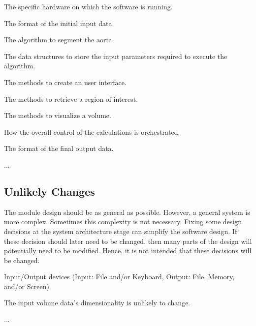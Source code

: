 \documentclass[12pt, titlepage]{article}
\newcounter{acnum}
\newcommand{\actheacnum}{AC\theacnum}
\newcounter{ucnum}
\newcommand{\uctheucnum}{UC\theucnum}
\begin{document}
\begin{description}
\item[ \actheacnum \label{acHardware}:] The specific hardware on which the software is running.
\item[ \actheacnum \label{acInput}:] The format of the initial input data.
\item[ \actheacnum \label{acAlgo}:] The algorithm to segment the aorta.
\item[ \actheacnum \label{acInputParams}:] The data structures to store the input parameters required to execute the algorithm.
\item[ \actheacnum \label{acInterface}:] The methods to create an user interface.
\item[ \actheacnum \label{acGetROI}:] The methods to retrieve a region of interest.
\item[ \actheacnum \label{acVisualize}:] The methods to visualize a volume.
\item[ \actheacnum \label{acControl}:] How the overall control of the calculations is orchestrated.
\item[ \actheacnum \label{acOutput}:] The format of the final output data.

\item ...
\end{description}

\subsection{Unlikely Changes} \label{SecUchange}

The module design should be as general as possible. However, a general system is
more complex. Sometimes this complexity is not necessary. Fixing some design
decisions at the system architecture stage can simplify the software design. If
these decision should later need to be changed, then many parts of the design
will potentially need to be modified. Hence, it is not intended that these
decisions will be changed.

\begin{description}
\item[ \uctheucnum \label{ucIO}:] Input/Output devices
  (Input: File and/or Keyboard, Output: File, Memory, and/or Screen).
\item[ \uctheucnum \label{ucVolDim}:] The input volume data's dimensionality is unlikely to change.
\item ...
\end{description}
\end{document}
